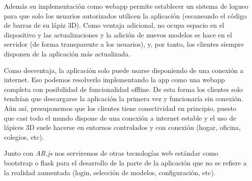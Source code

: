 \documentclass[12pt,a4paper]{article}
\begin{document}
Además su implementación como webapp permite establecer un sistema de logueo para que solo los usuarios autorizados utilicen la aplicación (escaneando el código de barras de su lápiz 3D). Como ventaja adicional, no ocupa espacio en el dispositivo y las actualizaciones y la adición de nuevos modelos se hace en el servidor (de forma transparente a los usuarios), y, por tanto, los clientes siempre disponen de la aplicación más actualizada. 

Como desventaja, la aplicación solo puede usarse disponiendo de una conexión a internet. Eso podemos resolverlo implementando la app como una webapp completa con posibilidad de funcionalidad offline. De esta forma los clientes solo tendrían que descargarse la aplicación la primera vez y funcionaría sin conexión. Aún así, presuponemos que los clientes tiene conectividad en principio, puesto que casi todo el mundo dispone de una conexión a internet estable y el uso de lápices 3D suele hacerse en entornos controlados y con conexión (hogar, oficina, colegios, etc).

Junto con \textit{AR.js} nos serviremos de otras tecnologías web estándar como bootstrap o flask para el desarrollo de la parte de la aplicación que no se refiere a la realidad aumentada (login, selección de modelos, configuración, etc).
\end{document}
